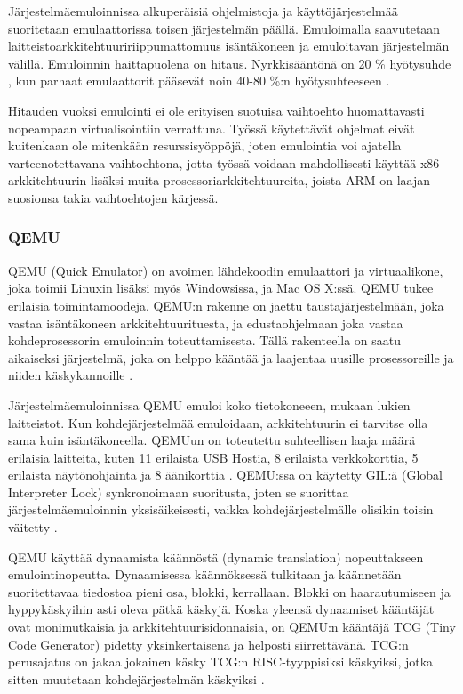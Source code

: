 Järjestelmäemuloinnissa alkuperäisiä ohjelmistoja ja käyttöjärjestelmää suoritetaan emulaattorissa toisen järjestelmän päällä. Emuloimalla saavutetaan laitteistoarkkitehtuuririippumattomuus isäntäkoneen ja emuloitavan järjestelmän välillä. Emuloinnin haittapuolena on hitaus. Nyrkkisääntönä on 20 \% hyötysuhde \cite{tinycc}, kun parhaat emulaattorit pääsevät noin 40-80 \%:n hyötysuhteeseen \cite{40pperf}.

Hitauden vuoksi emulointi ei ole erityisen suotuisa vaihtoehto huomattavasti nopeampaan virtualisointiin verrattuna. Työssä käytettävät ohjelmat eivät kuitenkaan ole mitenkään resurssisyöppöjä, joten emulointia voi ajatella varteenotettavana vaihtoehtona, jotta työssä voidaan mahdollisesti käyttää x86-arkkitehtuurin lisäksi muita prosessoriarkkitehtuureita, joista ARM on laajan suosionsa takia vaihtoehtojen kärjessä.

\subsubsection{QEMU}
QEMU (Quick Emulator) on avoimen lähdekoodin emulaattori ja virtuaalikone, joka toimii Linuxin lisäksi myös Windowsissa, ja Mac OS X:ssä. QEMU tukee erilaisia toimintamoodeja. QEMU:n rakenne on jaettu taustajärjestelmään, joka vastaa isäntäkoneen arkkitehtuurituesta, ja edustaohjelmaan joka vastaa kohdeprosessorin emuloinnin toteuttamisesta. Tällä rakenteella on saatu aikaiseksi järjestelmä, joka on helppo kääntää ja laajentaa uusille prosessoreille ja niiden käskykannoille \cite{qemu_doc}.

Järjestelmäemuloinnissa QEMU emuloi koko tietokoneeen, mukaan lukien laitteistot. Kun kohdejärjestelmää emuloidaan, arkkitehtuurin ei tarvitse olla sama kuin isäntäkoneella. QEMUun on toteutettu suhteellisen laaja määrä erilaisia laitteita, kuten 11 erilaista USB Hostia, 8 erilaista verkkokorttia, 5 erilaista näytönohjainta ja 8 äänikorttia \cite{qemu_doc}. QEMU:ssa on käytetty GIL:ä (Global Interpreter Lock) synkronoimaan suoritusta, joten se suorittaa järjestelmäemuloinnin yksisäikeisesti, vaikka kohdejärjestelmälle olisikin toisin väitetty \cite{qemu_tech}.

QEMU käyttää dynaamista käännöstä (dynamic translation) nopeuttakseen emulointinopeutta. Dynaamisessa käännöksessä tulkitaan ja käännetään suoritettavaa tiedostoa pieni osa, blokki, kerrallaan. Blokki on haarautumiseen ja hyppykäskyihin asti oleva pätkä käskyjä. Koska yleensä dynaamiset kääntäjät ovat monimutkaisia ja arkkitehtuurisidonnaisia, on QEMU:n kääntäjä TCG (Tiny Code Generator) pidetty yksinkertaisena ja helposti siirrettävänä. TCG:n perusajatus on jakaa jokainen käsky TCG:n RISC-tyyppisiksi käskyiksi, jotka sitten muutetaan kohdejärjestelmän käskyiksi \cite{qemu_tech}.


